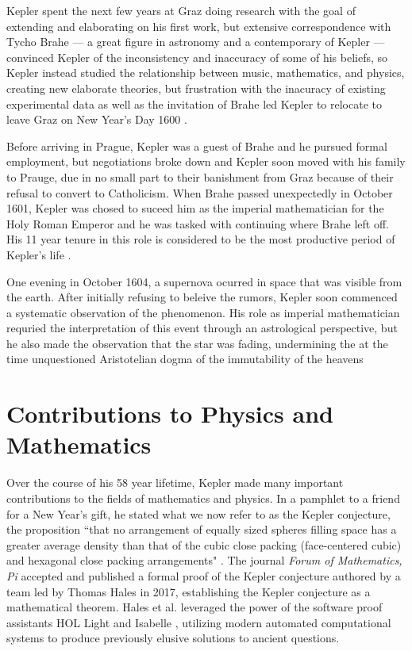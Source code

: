 \documentclass[11pt]{article}
\begin{document}
Kepler spent the next few years at Graz
doing research with the goal of extending
and elaborating on his first work,
but extensive correspondence with Tycho Brahe
--- a great figure in astronomy and a contemporary of Kepler ---
convinced Kepler
of the inconsistency and inaccuracy
of some of his beliefs, 
so Kepler instead studied the relationship between
music, mathematics, and physics,
creating new elaborate theories,
but frustration with
the inacuracy of existing experimental data
as well as the invitation of Brahe
led Kepler to relocate to leave Graz
on New Year's Day 1600 \cite{caspar}.

Before arriving in Prague,
Kepler was a guest of Brahe
and he pursued formal employment,
but negotiations broke down
and Kepler soon moved
with his family to Prauge,
due in no small part to their
banishment from Graz
because of their refusal
to convert to Catholicism.
When Brahe passed unexpectedly in October 1601,
Kepler was chosed to suceed him
as the imperial mathematician
for the Holy Roman Emperor
and he was tasked with
continuing where Brahe left off.
His 11 year tenure in this role
is considered to be the
most productive period of Kepler's life \cite{caspar}.

One evening in October 1604,
a supernova ocurred in space
that was visible from the earth.
After initially refusing to beleive the rumors,
Kepler soon commenced a systematic
observation of the phenomenon.
His role as imperial mathematician
requried the interpretation of this
event through an astrological perspective,
but he also made the observation
that the star was fading,
undermining the at the time unquestioned
Aristotelian dogma of the immutability of the heavens \cite{caspar}


\section{Contributions to Physics and Mathematics}

Over the course of his 58 year lifetime,
Kepler made many important contributions
to the fields of mathematics and physics.
In a pamphlet to a friend for a New Year's gift,
he stated what we now refer to as the Kepler conjecture,
the proposition
``that no arrangement of equally sized spheres
filling space has a greater average density than
that of the cubic close packing (face-centered cubic)
and hexagonal close packing arrangements" \cite{conjecture}.
The journal \textit{Forum of Mathematics, Pi}
accepted and published a formal proof
of the Kepler conjecture
authored by a team led by Thomas Hales in 2017,
establishing the Kepler conjecture
as a mathematical theorem.
Hales et al. leveraged the power of
the software proof assistants HOL Light and Isabelle \cite{hales},
utilizing modern automated computational systems
to produce previously elusive solutions to ancient questions.
\end{document}
